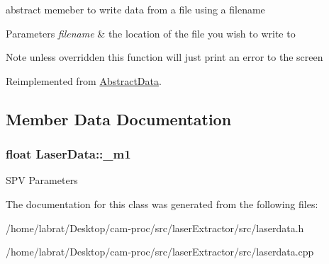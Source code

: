 abstract memeber to write data from a file using a filename 


\begin{DoxyParams}{Parameters}
{\em filename} & the location of the file you wish to write to \\
\hline
\end{DoxyParams}
\begin{DoxyNote}{Note}
unless overridden this function will just print an error to the screen 
\end{DoxyNote}


Reimplemented from \hyperlink{classAbstractData_a338dce47a9901032fd7b908a1c6df514}{Abstract\+Data}.



\subsection{Member Data Documentation}
\subsubsection[{\texorpdfstring{\+\_\+m1}{_m1}}]{\setlength{\rightskip}{0pt plus 5cm}float Laser\+Data\+::\+\_\+m1\hspace{0.3cm}{\ttfamily [protected]}}\hypertarget{classLaserData_afe4fc743c3fdeb927428196399ef60e2}{}\label{classLaserData_afe4fc743c3fdeb927428196399ef60e2}
S\+PV Parameters 

The documentation for this class was generated from the following files\+:\begin{DoxyCompactItemize}
\item 
/home/labrat/\+Desktop/cam-\/proc/src/laser\+Extractor/src/laserdata.\+h\item 
/home/labrat/\+Desktop/cam-\/proc/src/laser\+Extractor/src/laserdata.\+cpp\end{DoxyCompactItemize}
